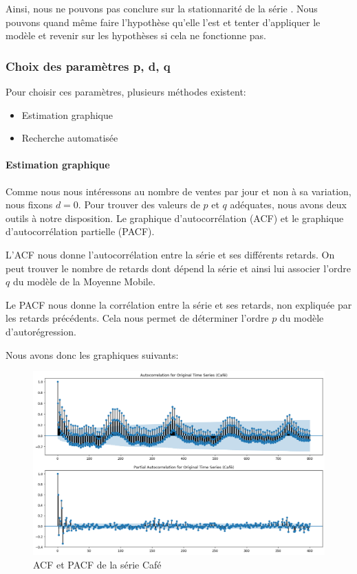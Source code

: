 Ainsi, nous ne pouvons pas conclure sur la stationnarité de la série \ts. Nous pouvons quand même faire l'hypothèse qu'elle l'est et tenter d'appliquer le modèle \ARIMA et revenir sur les hypothèses si cela ne fonctionne pas.


\subsubsection{Choix des paramètres p, d, q}
\label{subsec:params_pdq}

Pour choisir ces paramètres, plusieurs méthodes existent:
\begin{itemize}
    \item Estimation graphique
    \item Recherche automatisée
\end{itemize}

\paragraph{Estimation graphique}
\label{par:pdq_plots}

Comme nous nous intéressons au nombre de ventes par jour et non à sa variation, nous fixons $d=0$. Pour trouver des valeurs de $p$ et $q$ adéquates, nous avons deux outils à notre disposition. Le graphique d'autocorrélation (ACF) et le graphique d'autocorrélation partielle (PACF).

L'ACF nous donne l'autocorrélation entre la série et ses différents retards. On peut trouver le nombre de retards dont dépend la série et ainsi lui associer l'ordre $q$ du modèle de la Moyenne Mobile.

Le PACF nous donne la corrélation entre la série et ses retards, non expliquée par les retards précédents. Cela nous permet de déterminer l'ordre $p$ du modèle d'autorégression.


Nous avons donc les graphiques suivants:
\begin{figure}
    \centering
    \includegraphics[width=\textwidth]{figures/acf_pacf_cafe.png}
    \caption{ACF et PACF de la série Café}
    \label{fig:acf_pacf_cafe}
\end{figure}

